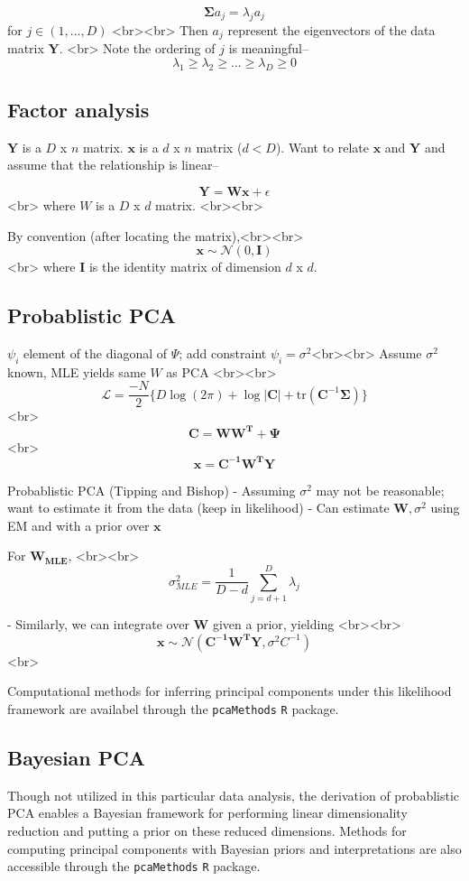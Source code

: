 \documentclass[english, 11pt]{article}\usepackage[]{graphicx}\usepackage[]{color}
\begin{document}
$$\mathbf{\Sigma} a_j = \lambda_j a_j$$
for $j \in (1, ..., D)$
<br><br>
Then $a_j$ represent the eigenvectors of the data matrix $\mathbf{Y}$. <br> Note the ordering of $j$ is meaningful-- 
$$ \lambda_1 \geq \lambda_2 \geq ... \geq \lambda_D \geq 0$$


\subsection{Factor analysis}

$\mathbf{Y}$ is a $D$ x $n$ matrix. $\mathbf{x}$ is a $d$ x $n$ matrix ($d < D$). Want to relate $\mathbf{x}$ and $\mathbf{Y}$ and assume that the relationship is linear--

$$ \mathbf{Y = Wx} + \epsilon$$<br>
where $W$ is a $D$ x $d$ matrix. <br><br>

By convention (after locating the matrix),<br><br> $$\mathbf{x} \sim \mathcal{N} (0, \mathbf{I})$$<br>
where $\mathbf{I}$ is the identity matrix of dimension $d$ x $d$. 

\subsection{Probablistic PCA}

$\psi_i$ element of the diagonal of $\Psi$; add constraint $\psi_i = \sigma^2$<br><br>
Assume $\sigma^2$ known, MLE yields same $W$ as PCA <br><br>
$$  \mathcal{L} = \frac{-N}{2}\{ D\log(2\pi) + \log|\mathbf{C}| + \textrm{tr}(\mathbf{C}^{-1}\mathbf{\Sigma})  \}   $$<br>
$$\mathbf{C} = \mathbf{WW^T }+ \mathbf{\Psi} $$ <br>
$$  \mathbf{x} = \mathbf{C^{-1}W^{T}Y}$$

Probablistic PCA (Tipping and Bishop)
- Assuming $\sigma^2$ may not be reasonable; want to estimate it from the data (keep in likelihood)
- Can estimate $\mathbf{W}, \sigma^2$ using EM and with a prior over $\mathbf{x}$

For  $\mathbf{W_{\textrm{MLE}}}$, <br><br> $$\sigma_{MLE}^2 = \frac{1}{D-d} \sum_{j = d +1}^D \lambda_j $$

- Similarly, we can integrate over $\mathbf{W}$ given a prior, yielding <br><br>
$$  \mathbf{x} \sim  \mathcal{N} (\mathbf{C^{-1}W^{T}Y}, \sigma^2C^{-1})$$ <br>


Computational methods for inferring principal components under this likelihood framework are availabel through the \texttt{pcaMethods} \texttt{R} package.

\subsection{Bayesian PCA}
Though not utilized in this particular data analysis, the derivation of probablistic PCA enables a Bayesian framework for performing linear dimensionality reduction and putting a prior on these reduced dimensions. \cite{bishop1999bayesian} Methods for computing principal components with Bayesian priors and interpretations are also accessible through the \texttt{pcaMethods} \texttt{R} package.
\end{document}
